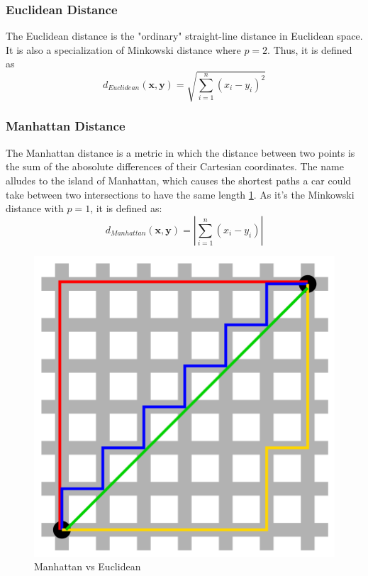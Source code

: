 \documentclass[conference]{IEEEtran}
\begin{document}
\subsubsection{Euclidean Distance}
\par
The Euclidean distance is the "ordinary" straight-line distance in Euclidean space. It is also a specialization of Minkowski distance where $p=2$. Thus, it is defined as
\begin{equation}
    d_{Euclidean}(\mathbf{x},\mathbf{y})=\sqrt{\sum_{i=1}^n(x_i-y_i)^2}
\end{equation}
\subsubsection{Manhattan Distance}
\par
The Manhattan distance is a metric in which the distance between two points is the sum of the abosolute differences of their Cartesian coordinates. The name alludes to the island of Manhattan, which causes the shortest paths a
car could take between two intersections to have the same length \ref{fig:mah}. As it's the Minkowski distance with $p=1$, it is defined as:
\begin{equation}
    d_{Manhattan}(\mathbf{x},\mathbf{y})=\left|\sum_{i=1}^n(x_i-y_i)\right|
\end{equation}
\begin{figure}[htbp]
	\centering
	\includegraphics[scale=0.3]{pic/manhattan.png}
	\caption{Manhattan vs Euclidean}
	\label{fig:mah}
\end{figure}
\end{document}

